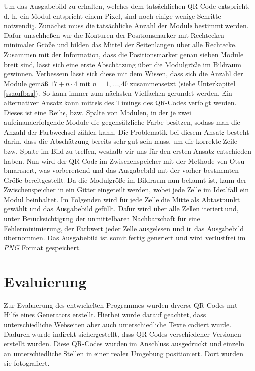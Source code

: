 \documentclass[a4paper, oneside, 12pt]{article}
\begin{document}
Um das Ausgabebild zu erhalten, welches dem tatsächlichen QR-Code entspricht, d. h. ein Modul entspricht einem Pixel, sind noch einige wenige Schritte notwendig.
Zunächst muss die tatsächliche Anzahl der Module bestimmt werden.
Dafür umschließen wir die Konturen der Positionsmarker mit Rechtecken minimaler Größe und bilden das Mittel der Seitenlängen über alle Rechtecke.
Zusammen mit der Information, dass die Positionsmarker genau sieben Module breit sind, lässt sich eine erste Abschätzung über die Modulgröße im Bildraum gewinnen.
Verbessern lässt sich diese mit dem Wissen, dass sich die Anzahl der Module gemäß $17 + n \cdot 4$ mit $n = 1, \dots, 40$ zusammensetzt (siehe Unterkapitel \ref{ss:aufbau}). So kann immer zum nächsten Vielfachen gerundet werden.
Ein alternativer Ansatz kann mittels des Timings des QR-Codes verfolgt werden.
Dieses ist eine Reihe, bzw. Spalte von Modulen, in der je zwei aufeinanderfolgende Module die gegensätzliche Farbe besitzen, sodass man die Anzahl der Farbwechsel zählen kann. Die Problematik bei diesem Ansatz besteht darin, dass die Abschätzung bereits sehr gut sein muss, um die korrekte Zeile bzw. Spalte im Bild zu treffen, weshalb wir uns für den ersten Ansatz entschieden haben.
Nun wird der QR-Code im Zwischenspeicher mit der Methode von Otsu binarisiert, was vorbereitend und das Ausgabebild mit der vorher bestimmten Größe bereitgestellt.
Da die Modulgröße im Bildraum nun bekannt ist, kann der Zwischenspeicher in ein Gitter eingeteilt werden, wobei jede Zelle im Idealfall ein Modul beinhaltet.
Im Folgenden wird für jede Zelle die Mitte als Abtastpunkt gewählt und das Ausgabebild gefüllt. Dafür wird über alle Zellen iteriert und, unter Berücksichtigung der unmittelbaren Nachbarschaft für eine Fehlerminimierung, der Farbwert jeder Zelle ausgelesen und in das Ausgabebild übernommen.
Das Ausgabebild ist somit fertig generiert und wird verlustfrei im \emph{PNG} Format gespeichert.

\newpage
\section{Evaluierung}
\label{s:evaluierung}

Zur Evaluierung des entwickelten Programmes wurden diverse QR-Codes mit Hilfe eines Generators erstellt. Hierbei wurde darauf geachtet, dass unterschiedliche Webseiten aber auch unterschiedliche Texte codiert wurde. Dadurch wurde indirekt sichergestellt, dass QR-Codes verschiedener Versionen erstellt wurden. Diese QR-Codes wurden im Anschluss ausgedruckt und einzeln an unterschiedliche Stellen in einer realen Umgebung positioniert. Dort wurden sie fotografiert. 
\end{document}
